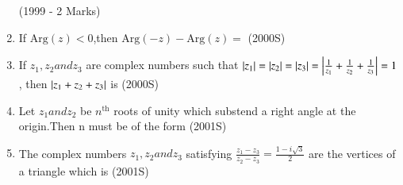 \documentclass[journal,12pt,twocolumn]{IEEEtran}
\theoremstyle{remark}
\begin{document}
\begin{enumerate}[start=6]
\hfill{(1999 - 2 Marks)}
\begin{enumerate}
\end{enumerate}
\item If $\mathrm{Arg}(z)<0$,then $\mathrm{Arg}(-z)-\mathrm{Arg}(z)=$
\hfill{(2000S)}
\begin{enumerate}
\end{enumerate}
\item If $z_1,z_2 and z_3$ are complex numbers such that $\left\vert z_1\right\vert=\left\vert z_2\right\vert=\left\vert z_3\right\vert=\left\vert\frac{1}{z_1}+\frac{1}{z_2}+\frac{1}{z_3}\right\vert=1$, then $\left\vert z_1+z_2+z_3\right\vert$ is 
\hfill{(2000S)}
\begin{enumerate}
\end{enumerate}
\item Let $z_1 and z_2$ be $n^{\text{th}}$ roots of unity which substend a right angle at the origin.Then n must be of the form
\hfill{(2001S)}
\begin{enumerate}
\end{enumerate}
\item The complex numbers $z_1,z_2 and z_3$ satisfying $\frac{z_1-z_3}{z_2-z_3}=\frac{1-i\sqrt{3}}{2}$ are the vertices of a triangle which is
\hfill{(2001S)}
\begin{enumerate}

\end{enumerate}
\end{enumerate}
\end{document}
